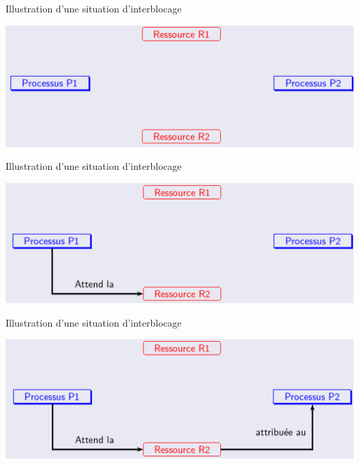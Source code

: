 \documentclass[10pt]{beamer}
\begin{document}
\begin{frame}
	\mframe{\Processus}
	\setlength{\shadowsize}{1pt}
	\begin{block}{Illustration d'une situation d'interblocage}
	\begin{center}	
	\includegraphics[scale=0.25]{../../Archi_Materielle/data/blocage_1}
	\end{center}
\end{block}
\end{frame}


\begin{frame}
	\mframe{\Processus}
	\setlength{\shadowsize}{1pt}
	\begin{block}{Illustration d'une situation d'interblocage}
		\begin{center}	
			\includegraphics[scale=0.25]{../../Archi_Materielle/data/blocage_2}
		\end{center}
	\end{block}
\end{frame}

\begin{frame}
	\mframe{\Processus}
	\setlength{\shadowsize}{1pt}
	\begin{block}{Illustration d'une situation d'interblocage}
		\begin{center}	
			\includegraphics[scale=0.25]{../../Archi_Materielle/data/blocage_3}
		\end{center}
	\end{block}
\end{frame}
\end{document}
